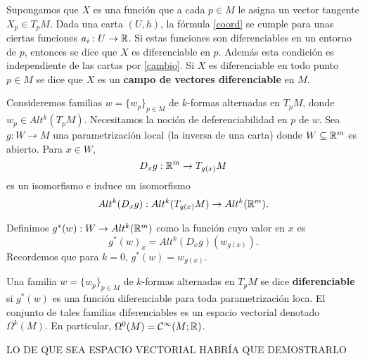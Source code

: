 \documentclass[CV.tex]{subfiles}
\begin{document}
Supongamos que $X$ es una función que a cada $p\in M$ le asigna un vector tangente $X_p\in T_pM$. Dada una carta $(U,h)$, la fórmula \ref{coord} se cumple para unas ciertas funciones $a_i:U\to\mathbb{R}$. Si estas funciones son diferenciables en un entorno de $p$, entonces se dice que $X$ es diferenciable en $p$. Además esta condición es independiente de las cartas por \ref{cambio}. Si $X$ es diferenciable en todo punto $p\in M$ se dice que $X$ es un \textbf{campo de vectores diferenciable} en $M$. 

Consideremos familias $w=\{w_p\}_{p\in M}$ de $k$-formas alternadas en $T_pM$, donde $w_p\in Alt^k(T_pM)$. Necesitamos la noción de deferenciabilidad en $p$ de $w$. Sea $g:W\to M$ una parametrización local (la inversa de una carta) donde $W\subseteq\mathbb{R}^m$ es abierto. Para $x\in W$,
\[
D_x g:\mathbb{R}^m\to T_{g(x)}M
\]
es un isomorfismo e induce un isomorfismo
\[
Alt^k(D_xg):Alt^k(T_{g(x)}M)\to Alt^k(\mathbb{R}^m).
\]

Definimos $g^*(w):W\to Alt^k(\mathbb{R}^m)$ como la función cuyo valor en $x$ es
\[
g^*(w)_x=Alt^k(D_xg)(w_{g(x)}).
\]
Recordemos que para $k=0$, $g^*(w)=w_{g(x)}$. 

\begin{defi}
Una familia $w=\{w_p\}_{p\in M}$ de $k$-formas alternadas en $T_pM$ se dice \textbf{diferenciable} si $g^*(w)$ es una función diferenciable para toda parametrización loca. El conjunto de tales familias diferenciables es un espacio vectorial denotado $\Omega^k(M)$. En particular, $\Omega^0(M)=\mathcal{C}^{\infty}(M;\mathbb{R})$. 

LO DE QUE SEA ESPACIO VECTORIAL HABRÍA QUE DEMOSTRARLO
\end{defi}
\end{document}
